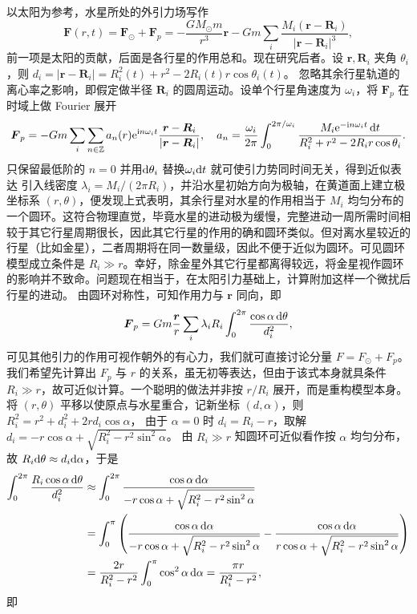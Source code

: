 以太阳为参考，水星所处的外引力场写作
\[\bm F(r,t)=\bm F_\odot+\bm F_p=-\frac{{G{M_\odot}m}}{r^3}\bm r-Gm\sum_i\frac{M_i(\bm r-\bm R_i)}{|\bm r-\bm R_i|^3},\]
前一项是太阳的贡献，后面是各行星的作用总和。现在研究后者。设 $\bm r,\bm R_i$ 夹角 $\theta_i$，则 $d_i=|\bm r-\bm R_i|=R_i^2(t)+r^2-2R_i(t)r\cos\theta_i(t)$。
忽略其余行星轨道的离心率之影响，即假定做半径 $\bm R_i$ 的圆周运动。设单个行星角速度为 $\omega_i$，将 $\bm F_p$ 在时域上做 Fourier 展开
\[
\vb* F_p=- Gm\sum_i \sum_{n\in\mathbb{Z}} {{a_n}(r){\mathrm{e}^{\mathrm{i} n{\omega_i}t}}}\frac{\vb* r-\vb* R_i}{|\vb* r-\vb* R_i|},\quad a_n=\frac{\omega_i}{2\pi}\int_0^{2\pi/\omega_i}{\frac{{M_i\mathrm{e}^{-\mathrm{i} n\omega_i t}\,\dd t}}{{R_i^2 + r^2 - 2R_ir\cos \theta_i}}}.
\]
只保留最低阶的 $n=0$ 并用$\dd\theta_i$ 替换$\omega_i\dd t$ 就可使引力势同时间无关，得到近似表达
引入线密度 $\lambda_i=M_i/(2\pi R_i)$，并沿水星初始方向为极轴，在黄道面上建立极坐标系 $(r,\theta)$，便发现上式表明，其余行星对水星的作用相当于 $M_i$ 均匀分布的一个圆环。这符合物理直觉，毕竟水星的进动极为缓慢，完整进动一周所需时间相较于其它行星周期很长，因此其它行星的作用的确和圆环类似。但对离水星较近的行星（比如金星），二者周期将在同一数量级，因此不便于近似为圆环。可见圆环模型成立条件是 $R_i\gg r$。幸好，除金星外其它行星都离得较远，将金星视作圆环的影响并不致命。问题现在相当于，在太阳引力基础上，计算附加这样一个微扰后行星的进动。
由圆环对称性，可知作用力与 $\bm r$ 同向，即
\[
\vb* F_p= Gm\frac{\vb* r}{r}\sum_i  \lambda_iR_i\int_0^{2\pi } \frac{\cos\alpha\,\dd\theta}{ d_i^2},
\]
可见其他引力的作用可视作朝外的有心力，我们就可直接讨论分量 $F=F_\odot+F_p$。
我们希望先计算出 $F_p$ 与 $r$ 的关系，虽无初等表达，但由于该式本身就具条件 $R_i\gg r$，故可近似计算。一个聪明的做法并非按 $r/R_i$ 展开，而是重构模型本身。将 $(r,\theta)$ 平移以使原点与水星重合，记新坐标 $(d,\alpha)$，则 $R_i^2=r^2+d_i^2+2rd_i\cos\alpha$，
由于 $\alpha=0$ 时 $d_i=R_i-r$，取解 $d_i=-r\cos\alpha+\sqrt{R_i^2-r^2\sin^2\alpha}$。
由 $R_i\gg r$ 知圆环可近似看作按 $\alpha$ 均匀分布，故 $ R_i\dd\theta\approx d_i\dd\alpha$，于是
\begin{align*}
    \int_0^{2\pi } \frac{R_i\cos\alpha\,\dd\theta}{ d_i^2 }&\approx \int_0^{2\pi } \frac{\cos\alpha\dd{\alpha}}{-r\cos\alpha+\sqrt{R_i^2-r^2\sin^2\alpha}}\\
    &=\int_0^{\pi } \left(\frac{\cos\alpha\dd{\alpha}}{-r\cos\alpha+\sqrt{R_i^2-r^2\sin^2\alpha}}-\frac{\cos\alpha\dd{\alpha}}{r\cos\alpha+\sqrt{R_i^2-r^2\sin^2\alpha}}\right)\\
    &=\frac{2r}{R_i^2-r^2} \int_0^{\pi }\cos^2\alpha\dd{\alpha}=\frac{\pi r}{R_i^2-r^2},
\end{align*}
即

